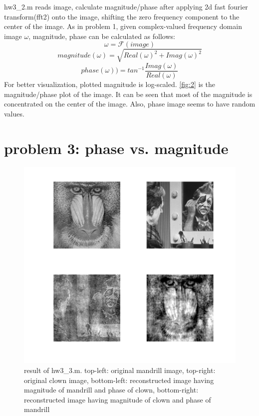 \documentclass[extendedabs]{bmvc2k}
\begin{document}
hw3\_2.m reads image, calculate magnitude/phase after applying 2d fast fourier transform(fft2)
onto the image, shifting the zero frequency component to the center of the image.
As in problem 1, given complex-valued frequency domain image $\omega$, magnitude, phase can be calculated as follows:
\[\omega = \mathcal{F}(image)\]
\[magnitude(\omega) = \sqrt{Real(\omega)^2 + Imag(\omega)^2}\]
\[phase(\omega)) = tan^{-1}\frac{Imag(\omega)}{Real(\omega)}\]
For better visualization, plotted magnitude is log-scaled.
\figurename{\ref{fig:2}} is the magnitude/phase plot of the image.
It can be seen that most of the magnitude is concentrated on the center of the image.
Also, phase image seems to have random values.

\section*{problem 3: phase vs. magnitude}

\begin{figure}[h]
    \centering
    \includegraphics[width=\linewidth]{hw3_3_1}
    \caption{result of hw3\_3.m. top-left: original mandrill image, top-right: original clown image,
    bottom-left: reconstructed image having magnitude of mandrill and phase of clown,
    bottom-right: reconstructed image having magnitude of clown and phase of mandrill}
    \label{fig:3}
\end{figure}
\end{document}

